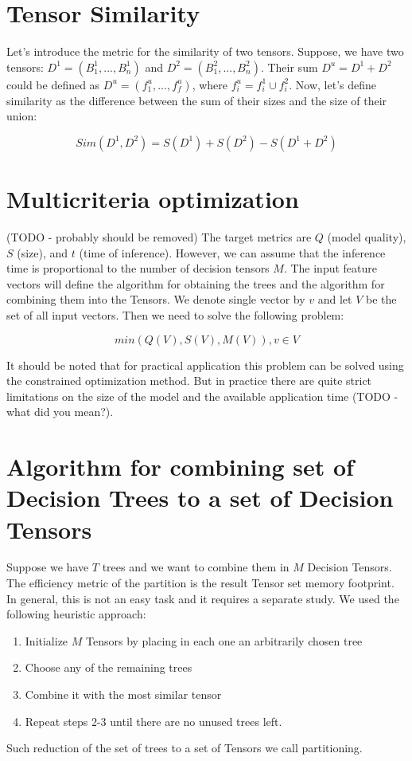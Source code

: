 \documentclass[a4paper]{jpconf}
\begin{document}
\section{Tensor Similarity}
Let's introduce the metric for the similarity of two tensors. Suppose, we have two tensors: $D^1 = (B^{1}_{1}, ..., B^{1}_{n})$ and $D^2 = (B^{2}_{1}, ..., B^{2}_{n})$. Their sum $D^u = D^1 + D^2$ could be defined as $D^u = (f^{u}_{1}, ..., f^{u}_{f})$, where $f^{u}_{i} = f^{1}_{i} \cup f^{2}_{i}$. Now, let's define similarity as the difference between the sum of their sizes and the size of their union:

$$Sim(D^1, D^2) = S(D^1) + S(D^2) - S(D^1 + D^2)$$

\section{Multicriteria optimization}
(TODO - probably should be removed)
The target metrics are $ Q $ (model quality), $ S $ (size), and $ t $ (time of inference). However, we can assume that the inference time is proportional to the number of decision tensors $ M $.
The input feature vectors will define the algorithm for obtaining the trees and the algorithm for combining them into the Tensors. We denote single vector by $ v $ and let $V$ be the set of all input vectors. Then we need to solve the following problem:

$$min(Q(V), S(V), M(V)), v \in V$$

It should be noted that for practical application this problem can be solved using the constrained optimization method. But in practice there are quite strict limitations on the size of the model and the available application time (TODO - what did you mean?).

\section{Algorithm for combining set of Decision Trees to a set of Decision Tensors}

Suppose we have $T$ trees and we want to combine them in $M$ Decision Tensors. The efficiency metric of the partition is the result Tensor set memory footprint.
In general, this is not an easy task and it requires a separate study. We used the following heuristic approach:
\medskip
\renewcommand{\theenumi}{\arabic{enumi}}
\begin{enumerate}
\item Initialize $M$ Tensors by placing in each one an arbitrarily chosen tree
\item Choose any of the remaining trees
\item Combine it with the most similar tensor
\item Repeat steps 2-3 until there are no unused trees left.
\end{enumerate}
Such reduction of the set of trees to a set of Tensors we call partitioning.
\end{document}
